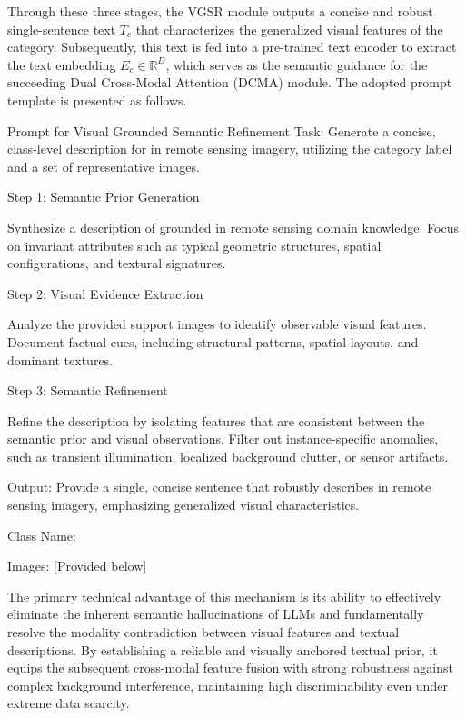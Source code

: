 \documentclass[lettersize,journal]{IEEEtran}
\begin{document}
Through these three stages, the VGSR module outputs a concise and robust single-sentence text $T_c$ that characterizes the generalized visual features of the category. 
Subsequently, this text is fed into a pre-trained text encoder to extract the text embedding $E_c \in \mathbb{R}^{D}$, which serves as the semantic guidance for the succeeding Dual Cross-Modal Attention (DCMA) module.
The adopted prompt template is presented as follows.
\begin{cipbox}{Prompt for Visual Grounded Semantic Refinement}
Task: Generate a concise, class-level description for \texttt{} in remote sensing imagery, utilizing the category label and a set of representative images.

Step 1: Semantic Prior Generation

Synthesize a description of \texttt{} grounded in remote sensing domain knowledge. Focus on invariant attributes such as typical geometric structures, spatial configurations, and textural signatures.

Step 2: Visual Evidence Extraction

Analyze the provided support images to identify observable visual features. Document factual cues, including structural patterns, spatial layouts, and dominant textures.

Step 3: Semantic Refinement

Refine the description by isolating features that are consistent between the semantic prior and visual observations. Filter out instance-specific anomalies, such as transient illumination, localized background clutter, or sensor artifacts.

Output:
Provide a single, concise sentence that robustly describes \texttt{} in remote sensing imagery, emphasizing generalized visual characteristics.

Class Name: \texttt{}

Images: [Provided below]
\end{cipbox}

The primary technical advantage of this mechanism is its ability to effectively eliminate the inherent semantic hallucinations of LLMs and fundamentally resolve the modality contradiction between visual features and textual descriptions. 
By establishing a reliable and visually anchored textual prior, it equips the subsequent cross-modal feature fusion with strong robustness against complex background interference, maintaining high discriminability even under extreme data scarcity.
\end{document}
